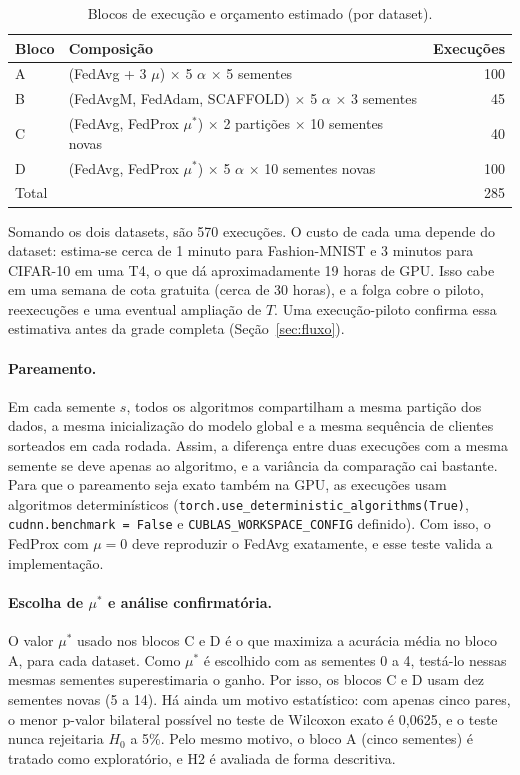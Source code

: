 \begin{table}[ht]
    \centering\small
    \caption{Blocos de execução e orçamento estimado (por dataset).}
    \label{tab:blocos}
    \begin{tabular}{@{}lp{5.6cm}r@{}}
        \toprule
        Bloco & Composição & Execuções \\
        \midrule
        A & (FedAvg + 3 $\mu$) $\times$ 5 $\alpha$ $\times$ 5 sementes & 100 \\
        B & (FedAvgM, FedAdam, SCAFFOLD) $\times$ 5 $\alpha$ $\times$ 3 sementes & 45 \\
        C & (FedAvg, FedProx $\mu^*$) $\times$ 2 partições $\times$ 10 sementes novas & 40 \\
        D & (FedAvg, FedProx $\mu^*$) $\times$ 5 $\alpha$ $\times$ 10 sementes novas & 100 \\
        \midrule
        Total & & 285 \\
        \bottomrule
    \end{tabular}
\end{table}

Somando os dois datasets, são 570 execuções. O custo de cada uma depende do dataset: estima-se cerca de 1 minuto para Fashion-MNIST e 3 minutos para CIFAR-10 em uma T4, o que dá aproximadamente 19 horas de GPU. Isso cabe em uma semana de cota gratuita (cerca de 30 horas), e a folga cobre o piloto, reexecuções e uma eventual ampliação de $T$. Uma execução-piloto confirma essa estimativa antes da grade completa (Seção~\ref{sec:fluxo}).

\paragraph{Pareamento.} Em cada semente $s$, todos os algoritmos compartilham a mesma partição dos dados, a mesma inicialização do modelo global e a mesma sequência de clientes sorteados em cada rodada. Assim, a diferença entre duas execuções com a mesma semente se deve apenas ao algoritmo, e a variância da comparação cai bastante. Para que o pareamento seja exato também na GPU, as execuções usam algoritmos determinísticos (\texttt{torch.use\_deterministic\_algorithms(True)}, \texttt{cudnn.benchmark = False} e \texttt{CUBLAS\_WORKSPACE\_CONFIG} definido). Com isso, o FedProx com $\mu = 0$ deve reproduzir o FedAvg exatamente, e esse teste valida a implementação.

\paragraph{Escolha de $\mu^*$ e análise confirmatória.} O valor $\mu^*$ usado nos blocos C e D é o que maximiza a acurácia média no bloco A, para cada dataset. Como $\mu^*$ é escolhido com as sementes 0 a 4, testá-lo nessas mesmas sementes superestimaria o ganho. Por isso, os blocos C e D usam dez sementes novas (5 a 14). Há ainda um motivo estatístico: com apenas cinco pares, o menor p-valor bilateral possível no teste de Wilcoxon exato é 0,0625, e o teste nunca rejeitaria $H_0$ a 5\%. Pelo mesmo motivo, o bloco A (cinco sementes) é tratado como exploratório, e H2 é avaliada de forma descritiva.

